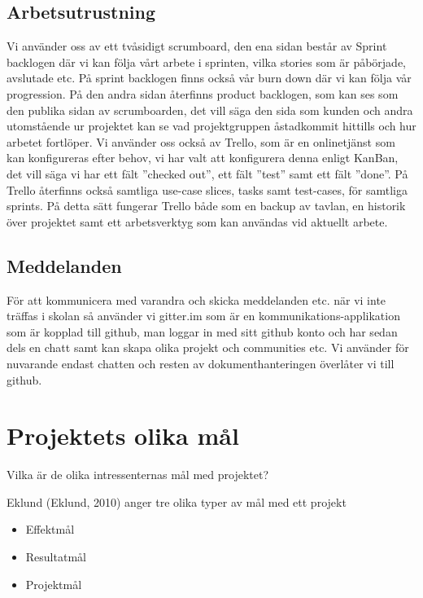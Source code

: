 \documentclass[11pt]{article}
\begin{document}
\subsection{Arbetsutrustning}
\label{sec:orgfb813f2}
Vi använder oss av ett tvåsidigt scrumboard, den ena sidan består av
Sprint backlogen där vi kan följa vårt arbete i sprinten, vilka stories
som är påbörjade, avslutade etc. På sprint backlogen finns också vår
burn down där vi kan följa vår progression. På den andra sidan återfinns
product backlogen, som kan ses som den publika sidan av scrumboarden,
det vill säga den sida som kunden och andra utomstående ur projektet kan
se vad projektgruppen åstadkommit hittills och hur arbetet fortlöper. Vi
använder oss också av Trello, som är en onlinetjänst som kan
konfigureras efter behov, vi har valt att konfigurera denna enligt
KanBan, det vill säga vi har ett fält ”checked out”, ett fält ”test”
samt ett fält ”done”. På Trello återfinns också samtliga use-case
slices, tasks samt test-cases, för samtliga sprints. På detta sätt
fungerar Trello både som en backup av tavlan, en historik över projektet
samt ett arbetsverktyg som kan användas vid aktuellt arbete.

\subsection{Meddelanden}
\label{sec:orgf4cbfa3}
För att kommunicera med varandra och skicka meddelanden etc. när vi inte
träffas i skolan så använder vi gitter.im som är en
kommunikations-applikation som är kopplad till github, man loggar in med
sitt github konto och har sedan dels en chatt samt kan skapa olika
projekt och communities etc. Vi använder för nuvarande endast chatten
och resten av dokumenthanteringen överlåter vi till github.

\section{Projektets olika mål}
\label{sec:orgac4a41c}
Vilka är de olika intressenternas mål med projektet?

Eklund (Eklund, 2010) anger tre olika typer av mål med ett projekt

\begin{itemize}
\item Effektmål

\item Resultatmål

\item Projektmål
\end{itemize}
\end{document}
